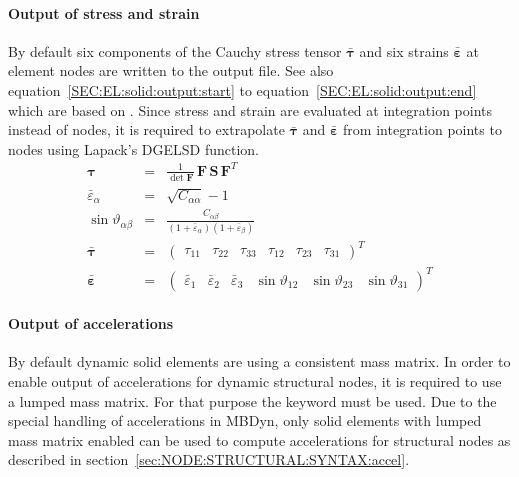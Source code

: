 \paragraph{Output of stress and strain}
By default six components of the Cauchy stress tensor $\bar{\boldsymbol{\tau}}$ and six strains $\bar{\boldsymbol{\varepsilon}}$ at element nodes are written to the output file.
See also equation~\ref{SEC:EL:solid:output:start} to equation~\ref{SEC:EL:solid:output:end} which are based on \cite{WALLRAPP1998}.
Since stress and strain are evaluated at integration points instead of nodes, it is required to extrapolate $\bar{\boldsymbol{\tau}}$ and $\bar{\boldsymbol{\varepsilon}}$
from integration points to nodes using Lapack's DGELSD function.
\begin{eqnarray}
  \boldsymbol{\tau} & = & \frac{1}{\det{\boldsymbol{F}}} \, \boldsymbol{F} \, \boldsymbol{S} \, \boldsymbol{F}^T   \label{SEC:EL:solid:output:start} \\
  \bar{\varepsilon}_{\alpha} & = & \sqrt{C_{\alpha\alpha}} - 1 \\
  \sin{\vartheta_{\alpha\beta}} & = & \frac{C_{\alpha\beta}}{\left(1 + \bar{\varepsilon}_{\alpha}\right)\left(1 + \bar{\varepsilon}_{\beta}\right)}   \label{SEC:EL:solid:output:end}  \\
  \bar{\boldsymbol{\tau}} & = & \begin{pmatrix}
    \tau_{11} &
    \tau_{22} &
    \tau_{33} &
    \tau_{12} &
    \tau_{23} &
    \tau_{31}
  \end{pmatrix}^T \\
  \bar{\boldsymbol{\varepsilon}} & = & \begin{pmatrix}
    \bar{\varepsilon}_1 &
    \bar{\varepsilon}_2 &
    \bar{\varepsilon}_3 &
    \sin{\vartheta}_{12} &
    \sin{\vartheta}_{23} &
    \sin{\vartheta}_{31}
  \end{pmatrix}^T
\end{eqnarray}

\paragraph{Output of accelerations}
By default dynamic solid elements are using a consistent mass matrix. In order to enable output of accelerations
for dynamic structural nodes, it is required to use a lumped mass matrix.
For that purpose the keyword  must be used.
Due to the special handling of accelerations in MBDyn, only solid elements with lumped mass matrix enabled
can be used to compute accelerations for structural nodes as described in section~\ref{sec:NODE:STRUCTURAL:SYNTAX:accel}.

